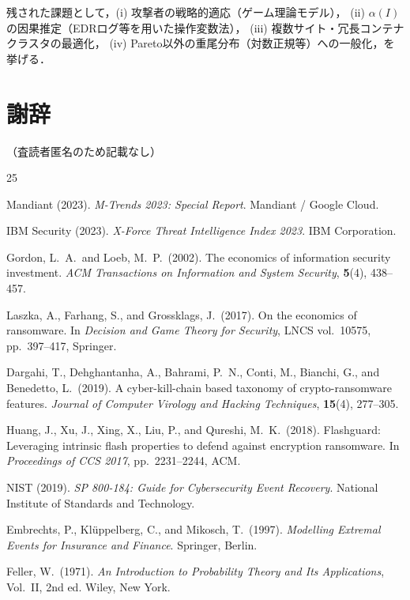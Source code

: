 \documentclass[12pt,a4paper]{article}
\theoremstyle{plain}
\theoremstyle{definition}
\theoremstyle{remark}
\begin{document}
残された課題として，(i) 攻撃者の戦略的適応（ゲーム理論モデル），
(ii) $\alpha(I)$の因果推定（EDRログ等を用いた操作変数法），
(iii) 複数サイト・冗長コンテナクラスタの最適化，
(iv) Pareto以外の重尾分布（対数正規等）への一般化，を挙げる．

\section*{謝辞}
（査読者匿名のため記載なし）

\begin{thebibliography}{25}

Mandiant (2023).
\textit{M-Trends 2023: Special Report}.
Mandiant / Google Cloud.

IBM Security (2023).
\textit{X-Force Threat Intelligence Index 2023}.
IBM Corporation.

Gordon, L.\ A.\ and Loeb, M.\ P.\ (2002).
The economics of information security investment.
\textit{ACM Transactions on Information and System Security},
\textbf{5}(4), 438--457.

Laszka, A., Farhang, S., and Grossklags, J.\ (2017).
On the economics of ransomware.
In \textit{Decision and Game Theory for Security},
LNCS vol.~10575, pp.~397--417, Springer.

Dargahi, T., Dehghantanha, A., Bahrami, P.\ N., Conti, M., Bianchi, G., and Benedetto, L.\ (2019).
A cyber-kill-chain based taxonomy of crypto-ransomware features.
\textit{Journal of Computer Virology and Hacking Techniques},
\textbf{15}(4), 277--305.

Huang, J., Xu, J., Xing, X., Liu, P., and Qureshi, M.\ K.\ (2018).
Flashguard: Leveraging intrinsic flash properties to defend against
encryption ransomware.
In \textit{Proceedings of CCS 2017}, pp.~2231--2244, ACM.

NIST (2019).
\textit{SP 800-184: Guide for Cybersecurity Event Recovery}.
National Institute of Standards and Technology.

Embrechts, P., Kl\"{u}ppelberg, C., and Mikosch, T.\ (1997).
\textit{Modelling Extremal Events for Insurance and Finance}.
Springer, Berlin.

Feller, W.\ (1971).
\textit{An Introduction to Probability Theory and Its Applications},
Vol.~II, 2nd ed. Wiley, New York.


\end{thebibliography}
\end{document}

